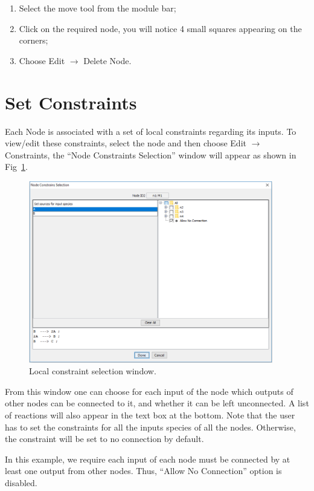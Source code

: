 \documentclass{report}
\begin{document}
\begin{enumerate}
	\item Select the move tool from the module bar;
	\item Click on the required node, you will notice 4 small squares appearing on the corners;
	\item Choose Edit $\rightarrow$ Delete Node.
\end{enumerate}

\section{Set Constraints}

Each Node is associated with a set of local constraints regarding its inputs. To view/edit these
constraints, select the node and then choose Edit $\rightarrow$ Constraints, the ``Node Constraints
Selection'' window will appear as shown in Fig~\ref{fig:7}.

\begin{figure}
	\centering
		\includegraphics[width=0.95\textwidth]{7}
	\caption{Local constraint selection window.}
	\label{fig:7}
\end{figure}

From this window one can choose for each input of the node which outputs of other nodes can
be connected to it, and whether it can be left unconnected. A list of reactions will also appear in
the text box at the bottom. Note that the user has to set the constraints for all the inputs
species of all the nodes. Otherwise, the constraint will be set to no connection by default.

In this example, we require each input of each node must be connected by at least one output
from other nodes. Thus, ``Allow No Connection'' option is disabled.
\end{document}
